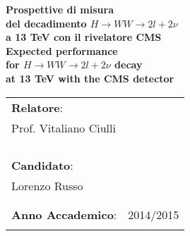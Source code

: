 \documentclass[a4paper,12pt,openright,twoside]{book}
\begin{document}
\begin{titlepage}
\begin{center}
\begin{minipage}{\textwidth}
\begin{minipage}{0.4\textwidth}
\begin{flushright}
      \end{flushright}
    \end{minipage}
  \end{minipage}
  \vspace*{1.5cm}
  \vfill
  \begin{minipage}{0.7\textwidth}
  \begin{flushleft}
      {\large {\bf Prospettive di misura}} \\
    \vspace*{0.2cm}
    {\large {\bf del decadimento $H\rightarrow WW\rightarrow2l+2\nu$}} \\
    \vspace*{0.2cm}
    {\large {\bf  a 13 TeV con il rivelatore CMS}} \\
    \vspace*{1cm}
    {\large {\bf Expected performance }} \\
    \vspace*{0.2cm}
   {\large {\bf for $H\rightarrow WW\rightarrow2l+2\nu$ decay }} \\
   \vspace*{0.2cm}
    {\large {\bf at 13 TeV with the CMS detector}} \\
    \vspace*{2cm}
    \begin{tabular}{l l}
      {\large \bf{Relatore}}: & {\large {\bf }}\\
      {\large Prof. Vitaliano Ciulli } & {\large {\bf }}\\
      \\
      \\
      \\
      \\
      {\large \bf{Candidato}}: & {\large{\bf }}\\
      {\large Lorenzo Russo} & {\large {\bf }}\\
\\
\\
{\large \bf{Anno Accademico}}: & {\large 2014/2015{\bf }}\\
      {\large } & {\large {\bf }}\\
    \end{tabular}
    \vfill
  \end{flushleft} 
 
  \end{minipage}
  \end{center}
\end{titlepage}
\end{document}
